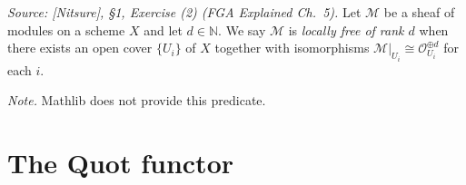 \begin{definition}

  \label{def:is_locally_free_of_rank}
  \textit{Source: [Nitsure], \S 1, Exercise (2) (FGA Explained Ch.~5).}
  Let \(\mathcal{M}\) be a sheaf of modules on a scheme \(X\) and let
  \(d \in \mathbb{N}\). We say \(\mathcal{M}\) is \emph{locally free of rank
  \(d\)} when there exists an open cover \(\{U_i\}\) of \(X\) together with
  isomorphisms \(\mathcal{M}|_{U_i} \cong \mathcal{O}_{U_i}^{\oplus d}\) for
  each \(i\).

  \emph{Note.} Mathlib does not provide this predicate.
\end{definition}

\section{The Quot functor}
\label{sec:quot_functor}

